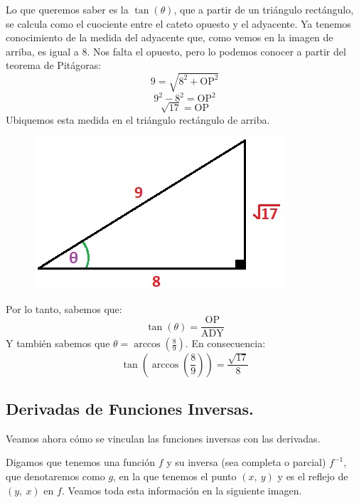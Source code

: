 \documentclass[12pt]{article}
\begin{document}
Lo que queremos saber es la $\tan(\theta)$, que a partir de un triángulo rectángulo, se calcula como el cuociente entre el cateto opuesto y el adyacente. Ya tenemos conocimiento de la medida del adyacente que, como vemos en la imagen de arriba, es igual a $8$. Nos falta el opuesto, pero lo podemos conocer a partir del teorema de Pitágoras:
\[9 = \sqrt{8^{2} + \text{OP}^{2}}\]
\[9^{2} - 8^{2} = \text{OP}^{2}\]
\[\sqrt{17} = \text{OP}\]
Ubiquemos esta medida en el triángulo rectángulo de arriba.

\newpage

\begin{figure}[hbt!]
\centering
\includegraphics[scale=0.7]{img/rect-trig-inv-fun-2.jpg}
\end{figure}

Por lo tanto, sabemos que:
\[\tan(\theta) = \frac{\text{OP}}{\text{ADY}}\]
Y también sabemos que $\theta = \arccos\left(\frac{8}{9}\right)$. En consecuencia:
\[\tan\left(\arccos\left(\frac{8}{9}\right)\right) = \frac{\sqrt{17}}{8}\]




\subsection{Derivadas de Funciones Inversas.}

Veamos ahora cómo se vinculan las funciones inversas con las derivadas.

Digamos que tenemos una función $f$ y su inversa (sea completa o parcial) $f^{-1}$, que denotaremos como $g$, en la que tenemos el punto $(x, \ y)$ y es el reflejo de $(y, \ x)$ en $f$. Veamos toda esta información en la siguiente imagen.

\newpage
\end{document}
